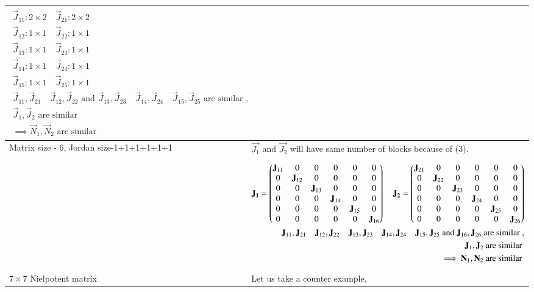 \documentclass[journal,12pt]{IEEEtran}
\begin{document}
\begin{longtable}{|p{5cm}|p{13cm}|}
{\begin{align*}
    \vec{J}_{11}: 2\times2 \quad \vec{J}_{21}: 2\times2\\
    \vec{J}_{12}: 1\times1 \quad \vec{J}_{22}: 1\times1\\
    \vec{J}_{13}: 1\times1 \quad \vec{J}_{23}: 1\times1\\
    \vec{J}_{14}: 1\times1 \quad \vec{J}_{24}: 1\times1\\
    \vec{J}_{15}: 1\times1 \quad \vec{J}_{25}: 1\times1\\   
    \vec{J}_{11}, \vec{J}_{21}\quad \vec{J}_{12}, \vec{J}_{22}  \text{ and } \vec{J}_{13}, \vec{J}_{23} \quad \vec{J}_{14}, \vec{J}_{24} \quad \vec{J}_{15}, \vec{J}_{25} \text{ are similar }, \\
    \vec{J}_{1}, \vec{J}_{2} \text{ are similar }\\
    \implies \vec{N}_{1}, \vec{N}_{2} \text{ are similar }
\end{align*}}\\
\hline
Matrix size - 6, Jordan size-1+1+1+1+1+1 & $\vec{J_1}$ and $\vec{J_2}$ will have same number of blocks because of (3).
\\&
\parbox{12cm}{\begin{align*}
    \mathbf{J_1}=\begin{pmatrix}\mathbf{J}_{11}&0&0&0&0&0 \\ 0&\mathbf{J}_{12}&0&0&0&0 \\ 0&0&\mathbf{J}_{13}&0&0&0\\ 0&0&0&\mathbf{J}_{14}&0&0\\ 0&0&0&0&\mathbf{J}_{15}&0\\ 0&0&0&0&0&\mathbf{J}_{16}\end{pmatrix} \quad 
    \mathbf{J_2}=\begin{pmatrix}\mathbf{J}_{21}&0&0&0&0&0 \\ 0&\mathbf{J}_{22}&0&0&0&0 \\ 0&0&\mathbf{J}_{23}&0&0&0\\ 0&0&0&\mathbf{J}_{24}&0&0\\ 0&0&0&0&\mathbf{J}_{25}&0\\ 0&0&0&0&0&\mathbf{J}_{26}\end{pmatrix}\\
    \mathbf{J}_{11}, \mathbf{J}_{21} \quad \mathbf{J}_{12}, \mathbf{J}_{22} \quad \mathbf{J}_{13}, \mathbf{J}_{23} \quad \mathbf{J}_{14}, \mathbf{J}_{24} \quad \mathbf{J}_{15}, \mathbf{J}_{25} \text{ and } \mathbf{J}_{16}, \mathbf{J}_{26} \text{ are similar }, \\
    \mathbf{J}_{1}, \mathbf{J}_{2} \text{ are similar }\\
    \implies \mathbf{N}_{1}, \mathbf{N}_{2} \text{ are similar }
\end{align*}}\\
\hline
$7 \times 7$ Nielpotent matrix & 
Let us take a counter example,\\

\end{longtable}
\end{document}
